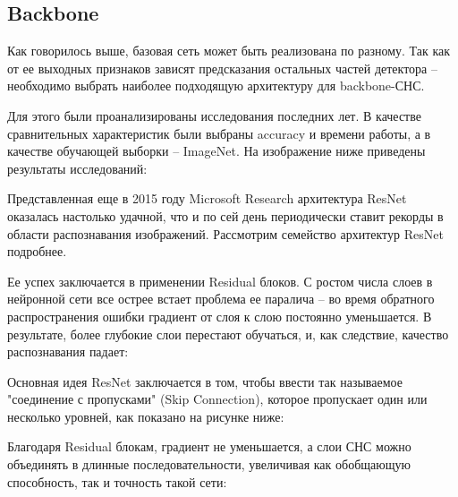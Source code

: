 \subsection{Backbone}

Как говорилось выше, базовая сеть может быть реализована по разному. Так как от ее выходных признаков зависят предсказания остальных частей детектора -- необходимо выбрать наиболее подходящую архитектуру для backbone-СНС.

Для этого были проанализированы исследования последних лет. В качестве сравнительных характеристик были выбраны accuracy и времени работы, а в качестве обучающей выборки -- ImageNet. На изображение ниже приведены результаты исследований:


Представленная еще в 2015 году Microsoft Research архитектура ResNet \cite{lib-resnet} оказалась настолько удачной, что и по сей день периодически ставит рекорды в области распознавания изображений. Рассмотрим семейство архитектур ResNet подробнее.

Ее успех заключается в применении Residual блоков. С ростом числа слоев в нейронной сети все острее встает проблема ее паралича -- во время обратного распространения ошибки градиент от слоя к слою постоянно уменьшается. В результате, более глубокие слои перестают обучаться, и, как следствие, качество распознавания падает:


Основная идея ResNet заключается в том, чтобы ввести так называемое "соединение с пропусками" (Skip Connection), которое пропускает один или несколько уровней, как показано на рисунке ниже:


Благодаря Residual блокам, градиент не уменьшается, а слои СНС можно объединять в длинные последовательности, увеличивая как обобщающую способность, так и точность такой сети:

